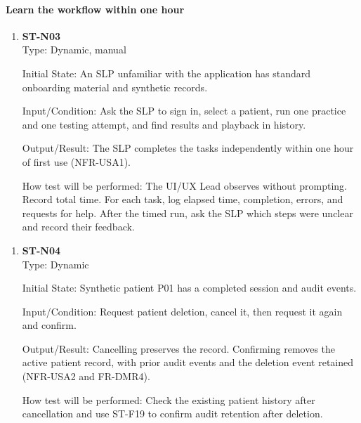 \documentclass[12pt, titlepage]{article}
\begin{document}
\paragraph{Learn the workflow within one hour}
\begin{enumerate}
    \item \textbf{ST-N03}\\

    Type: Dynamic, manual

    Initial State: An SLP unfamiliar with the application has standard onboarding material and synthetic records.

    Input/Condition: Ask the SLP to sign in, select a patient, run one practice and one testing attempt, and find results and playback in history.

    Output/Result: The SLP completes the tasks independently within one hour of first use (NFR-USA1).

    How test will be performed: The UI/UX Lead observes without prompting. Record total time. For each task, log elapsed time, completion, errors, and requests for help. After the timed run, ask the SLP which steps were unclear and record their feedback.

\end{enumerate}

\begin{enumerate}
    \item \textbf{ST-N04}\\

    Type: Dynamic

    Initial State: Synthetic patient P01 has a completed session and audit events.

    Input/Condition: Request patient deletion, cancel it, then request it again and confirm.

    Output/Result: Cancelling preserves the record. Confirming removes the active patient record, with prior audit events and the deletion event retained (NFR-USA2 and FR-DMR4).

    How test will be performed: Check the existing patient history after cancellation and use ST-F19 to confirm audit retention after deletion.

\end{enumerate}
\end{document}
